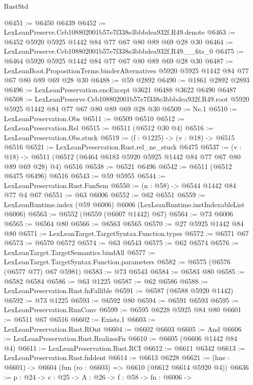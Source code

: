 \begin{lexlean}{RustStd}
\begin{coremodule}
@6451 := @6450 @6439
@6452 := LexLeanPreserve.Ceb108802001b57e7f338e3bbbdea932f.R49.denote
@6463 := @6452 @5920 @5925 @1442 @84 @77 @67 @80 @89 @69 @28 @30
@6464 := LexLeanPreserve.Ceb108802001b57e7f338e3bbbdea932f.R49.__fits_0
@6475 := @6464 @5920 @5925 @1442 @84 @77 @67 @80 @89 @69 @28 @30
@6487 := LexLeanBoot.PropositionTerms.binderAlternatives
    @5920
    @5925
    @1442
    @84
    @77
    @67
    @80
    @89
    @69
    @28
    @30
@6488 := @59 @2892
@6490 := @1861 @2892 @2893
@6496 := LexLeanPreservation.encExcept @3621 @6488 @3622 @6490 @6487
@6508 := LexLeanPreserve.Ceb108802001b57e7f338e3bbbdea932f.R49.root
    @5920
    @5925
    @1442
    @84
    @77
    @67
    @80
    @89
    @69
    @28
    @30
@6509 := Ne.{1}
@6510 := LexLeanPreservation.Obs
@6511 := @6509 @6510
@6512 := LexLeanPreservation.Rel
@6515 := @6511 (@6512 @30 @4)
@6516 := LexLeanPreservation.Obs.stuck
@6519 := (f : @1225) -> (v : @18) -> @6515 @6516
@6521 := LexLeanPreservation.Rust.rel_ne_stuck @6475
@6537 := (v : @18) ->
  @6511 (@6512 (@6464 @6183 @5920 @5925 @1442 @84 @77 @67 @80 @89 @69 @28) @4) @6516
@6538 := @6521 @6496
@6542 := @6511 (@6512 @6475 @6496) @6516
@6543 := @59 @5955
@6544 := LexLeanPreservation.Rust.FunSem
@6550 := (n : @58) -> @6544 @1442 @84 @77 @4 @67
@6551 := @63 @6006
@6552 := @62 @6551
@6559 := LexLeanRuntime.index (@59 @6006) @6006 (LexLeanRuntime.instIndexableList @6006)
@6563 := @6552 (@6559 (@6007 @1442) @67)
@6564 := @73 @6006
@6565 := @6564 @80
@6566 := @6563 @6565
@6570 := @27 @5925 @1442 @84 @80
@6571 := LexLeanTarget.TargetSyntax.Function.types
@6572 := @6571 @67
@6573 := @6570 @6572
@6574 := @63 @6543
@6575 := @62 @6574
@6576 := LexLeanTarget.TargetSemantics.bindAll
@6577 := LexLeanTarget.TargetSyntax.Function.parameters
@6582 := @6575 (@6576 (@6577 @77) @67 @5981)
@6583 := @73 @6543
@6584 := @6583 @80
@6585 := @6582 @6584
@6586 := @63 @1225
@6587 := @62 @6586
@6588 := LexLeanPreservation.Rust.fnFallible
@6591 := @6587 (@6588 @5920 @1442)
@6592 := @73 @1225
@6593 := @6592 @80
@6594 := @6591 @6593
@6595 := LexLeanPreservation.RunConv
@6599 := @6595 @6228 @5925 @84 @80
@6601 := @6511 @67 @6516
@6602 := Exists.{1}
@6603 := LexLeanPreservation.Rust.ROut
@6604 := @6602 @6603
@6605 := And
@6606 := LexLeanPreservation.Rust.RealizesFn
@6610 := @6605 (@6606 @1442 @84 @4)
@6611 := LexLeanPreservation.Rust.RCI
@6612 := @6611 @6342
@6613 := LexLeanPreservation.Rust.fnIdent
@6614 := @6613 @6228
@6621 := (hne : @6601) -> @6604 (fun (ro : @6603) => @6610 (@6612 @6614 @5920 @4))
@6636 := {p : @24} ->
  {c : @25} ->
  {A : @26} ->
  {f : @58} ->
  {fn : @6006} ->

\end{coremodule}
\end{lexlean}
